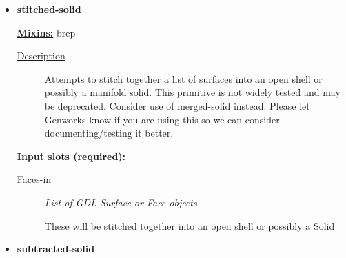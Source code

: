 \documentclass [11pt]{book}
\begin{document}
\begin{itemize}







\item {}
\label{prim:stitched-solid}
\textbf{stitched-solid}


\textbf{
\underline{Mixins:}} brep





\begin{description}

\item [
\underline{Description}]


Attempts to stitch together a list of
  surfaces into an open shell or possibly a manifold solid. This
  primitive is not widely tested and may be deprecated. Consider use
  of merged-solid instead. Please let Genworks know if you are using
  this so we can consider documenting/testing it better.



\end{description}








\textbf{
\underline{Input slots (required):}}

\begin{description}

\item [Faces-in]
\emph{List of GDL Surface or Face objects}

 These will be stitched together into an open shell or possibly a Solid




\end{description}







\item {}
\label{prim:subtracted-solid}
\textbf{subtracted-solid}



\end{itemize}
\end{document}

